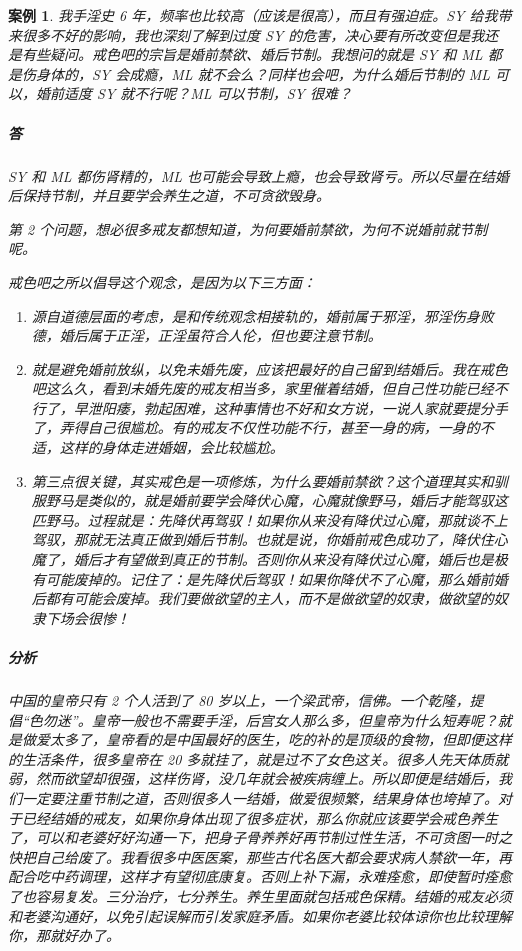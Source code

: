 \documentclass[fontset=founder]{ctexart}
\newtheorem{case}{案例}
\begin{document}
\begin{case}
    我手淫史 6 年，频率也比较高（应该是很高），而且有强迫症。SY 给我带来很多不好的影响，我也深刻了解到过度 SY 的危害，决心要有所改变但是我还是有些疑问。戒色吧的宗旨是婚前禁欲、婚后节制。我想问的就是 SY 和 ML 都是伤身体的，SY 会成瘾，ML 就不会么？同样也会吧，为什么婚后节制的 ML 可以，婚前适度 SY 就不行呢？ML 可以节制，SY 很难？

    \subparagraph{答} SY 和 ML 都伤肾精的，ML 也可能会导致上瘾，也会导致肾亏。所以尽量在结婚后保持节制，并且要学会养生之道，不可贪欲毁身。

    \rm 第 2 个问题，想必很多戒友都想知道，为何要婚前禁欲，为何不说婚前就节制呢。

    戒色吧之所以倡导这个观念，是因为以下三方面：

    \begin{enumerate}
        \item 源自道德层面的考虑，是和传统观念相接轨的，婚前属于邪淫，邪淫伤身败德，婚后属于正淫，正淫虽符合人伦，但也要注意节制。
        \item 就是避免婚前放纵，以免未婚先废，应该把最好的自己留到结婚后。我在戒色吧这么久，看到未婚先废的戒友相当多，家里催着结婚，但自己性功能已经不行了，早泄阳痿，勃起困难，这种事情也不好和女方说，一说人家就要提分手了，弄得自己很尴尬。有的戒友不仅性功能不行，甚至一身的病，一身的不适，这样的身体走进婚姻，会比较尴尬。
        \item 第三点很关键，其实戒色是一项修炼，为什么要婚前禁欲？这个道理其实和驯服野马是类似的，就是婚前要学会降伏心魔，心魔就像野马，婚后才能驾驭这匹野马。过程就是：先降伏再驾驭！如果你从来没有降伏过心魔，那就谈不上驾驭，那就无法真正做到婚后节制。也就是说，你婚前戒色成功了，降伏住心魔了，婚后才有望做到真正的节制。否则你从来没有降伏过心魔，婚后也是极有可能废掉的。记住了：是先降伏后驾驭！如果你降伏不了心魔，那么婚前婚后都有可能会废掉。我们要做欲望的主人，而不是做欲望的奴隶，做欲望的奴隶下场会很惨！
    \end{enumerate}

    \it \subparagraph{分析} 中国的皇帝只有 2 个人活到了 80 岁以上，一个梁武帝，信佛。一个乾隆，提倡“色勿迷”。皇帝一般也不需要手淫，后宫女人那么多，但皇帝为什么短寿呢？就是做爱太多了，皇帝看的是中国最好的医生，吃的补的是顶级的食物，但即便这样的生活条件，很多皇帝在 20 多就挂了，就是过不了女色这关。很多人先天体质就弱，然而欲望却很强，这样伤肾，没几年就会被疾病缠上。所以即便是结婚后，我们一定要注重节制之道，否则很多人一结婚，做爱很频繁，结果身体也垮掉了。对于已经结婚的戒友，如果你身体出现了很多症状，那么你就应该要学会戒色养生了，可以和老婆好好沟通一下，把身子骨养养好再节制过性生活，不可贪图一时之快把自己给废了。我看很多中医医案，那些古代名医大都会要求病人禁欲一年，再配合吃中药调理，这样才有望彻底康复。否则上补下漏，永难痊愈，即使暂时痊愈了也容易复发。三分治疗，七分养生。养生里面就包括戒色保精。结婚的戒友必须和老婆沟通好，以免引起误解而引发家庭矛盾。如果你老婆比较体谅你也比较理解你，那就好办了。
\end{case}
\end{document}

